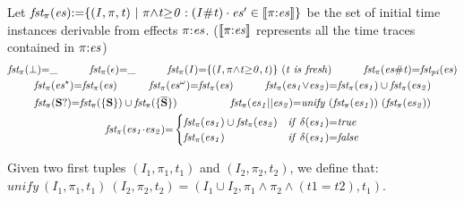 \documentclass[acmsmall,10pt,review]{acmart}
\newcommand{\es}{\textcolor{black}{\ensuremath{{es}}}}
\newcommand\pure[1]{ \textcolor{black}{#1}}
\newcommand{\seq}{\cdot}
\newcommand{\code}[1]{{\tt{\ensuremath{\m{#1}}}}}
\newcommand{\esn}[2]{\ensuremath{#1^{#2}}}
\newcommand{\empt}{\textcolor{black}{\ensuremath{\epsilon}}}
\newcommand{\bott}{\textcolor{black}{\ensuremath{\bot}}}
\newcommand{\m}{\mathit}
\begin{document}
\begin{definition}[First]\label{First}
Let \code{fst_{\pure{\pi}}(\es){:=}\{ (I,  \pi, t) \ |\  \pi {\wedge} t{\geq}0 : (I\# t) \cdot \es^\prime \in \llbracket  \pi {:} \es \rrbracket \}} be the set of initial time instances derivable from effects \code{\pi {:} \es}. (\code{\llbracket  \pi {:} \es \rrbracket } represents all the time  traces contained in \code{\pi {:} \es}) 
{ 
 \begin{gather*} 
\code{fst_{\pure{\pi}}( \bott) {=} \_ } \qquad\quad
\code{fst_{\pure{\pi}}(\empt) {=} \_ } \qquad\quad
\code{fst_{\pure{\pi}}( I ) {=} \{ (I, \pi {\wedge} t{\geq}0, t) \}  \ (t\ is\ fresh)} 
\qquad\quad
   \code{fst_{\pure{\pi}}(  \es \# t) {=}  fst_{pi}(\es)}
 \\
\code{fst_{\pure{\pi}}( \esn{\es}{\star} ) {=} fst_{\pure{\pi}}({ \es})}
\qquad\quad
\code{fst_{\pure{\pi}}( \esn{\es}{\omega} ) {=} fst_{\pure{\pi}}({ \es})} 
\qquad\quad
\code{fst_{\pure{\pi}}(  \es_1 {\vee} \es_2) {=} fst_{\pure{\pi}}(  \es_1) \cup fst_{\pure{\pi}}(  \es_2)  }  \\
\code{fst_{\pure{\pi}}( \textbf{S}? ) {=} fst_{\pure{\pi}}( \{\textbf{S}\} ) \cup fst_{\pure{\pi}}( \{ \overline{\textbf{S}} \} ) }
    \qquad\qquad\quad
   \code{fst_{\pure{\pi}}(  \es_1 {||} \es_2) {=} unify \ 
    (fst_{\pure{\pi}}(  \es_1)) \  (fst_{\pure{\pi}}(  \es_2))  }  
   \\
{
\code{fst_{\pure{\pi}}(\es_1 {\seq} \es_2) {=} } 
\begin{cases}
      \code{\code{fst_{\pure{\pi}}(  \es_1)} \cup \code{fst_{\pure{\pi}}(  \es_2)} } & \code{ if\ \delta(\es_1) {=} true}\\
      \code{\code{fst_{\pure{\pi}}(  \es_1)}} & \code{  if\ \delta(\es_1) {=} false}
    \end{cases} 
    }  
\end{gather*}
}
\end{definition}


\begin{definition}\label{unify} Given two first tuples \code{(I_1, \pi_1, t_1)} and \code{(I_2, \pi_2, t_2) }, we define that: 
\code{unify\ (I_1, \pi_1, t_1)\  (I_2, \pi_2, t_2) = (I_1 \cup I_2, \pi_1 \wedge \pi_2 \wedge (t1 {=} t2), t_1)}.
\end{definition}
\end{document}
